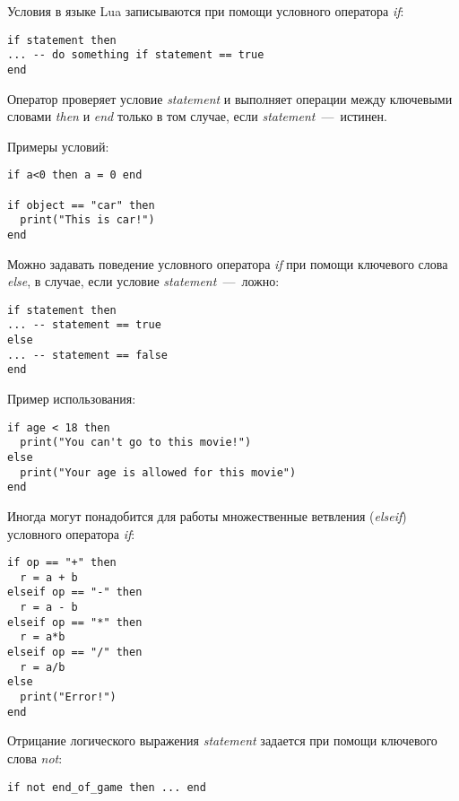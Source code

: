 Условия в языке Lua записываются при помощи условного оператора \emph{if}:

\begin{lstlisting}
if statement then
... -- do something if statement == true
end
\end{lstlisting}

Оператор проверяет условие \emph{statement} и выполняет операции между ключевыми словами \emph{then} и \emph{end} только в том случае, если \emph{statement}~---~истинен.

Примеры условий:

\begin{lstlisting}
if a<0 then a = 0 end

if object == "car" then
  print("This is car!")
end
\end{lstlisting}

Можно задавать поведение условного оператора \emph{if} при помощи ключевого слова \emph{else}, в случае, если условие \emph{statement}~---~ложно:

\begin{lstlisting}
if statement then
... -- statement == true
else
... -- statement == false
end
\end{lstlisting}

Пример использования:

\begin{lstlisting}
if age < 18 then
  print("You can't go to this movie!")
else
  print("Your age is allowed for this movie")
end
\end{lstlisting}

Иногда могут понадобится для работы множественные ветвления (\emph{elseif}) условного оператора \emph{if}:

\begin{lstlisting}
if op == "+" then
  r = a + b
elseif op == "-" then
  r = a - b
elseif op == "*" then
  r = a*b
elseif op == "/" then
  r = a/b
else
  print("Error!")
end
\end{lstlisting}

Отрицание логического выражения \emph{statement} задается при помощи ключевого слова \emph{not}:

\begin{lstlisting}
if not end_of_game then ... end
\end{lstlisting}

